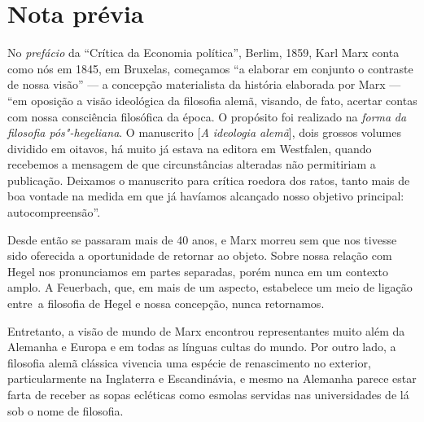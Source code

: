{\let\clearpage\relax\chapter*{Nota prévia\footnotemark}}


No \emph{prefácio} da ``Crítica da Economia política'', Berlim, 1859,
Karl Marx conta como nós em 1845, em Bruxelas, começamos ``a elaborar em
conjunto o contraste de nossa visão'' --- a concepção materialista da
história elaborada por Marx --- ``em oposição a visão ideológica da
filosofia alemã, visando, de fato, acertar contas com nossa consciência
filosófica da época. O propósito foi realizado na \emph{forma} \emph{da
filosofia pós"-hegeliana}. O manuscrito {[}\emph{A ideologia alemã}{]},
dois grossos volumes dividido em oitavos, há muito já estava na editora
em Westfalen, quando recebemos a mensagem de que circunstâncias
alteradas não permitiriam a publicação. Deixamos o manuscrito para
crítica roedora dos ratos, tanto mais de boa vontade na medida em que já
havíamos alcançado nosso objetivo principal: autocompreensão''.

Desde então se passaram mais de 40 anos, e Marx morreu sem que nos
tivesse sido oferecida a oportunidade de retornar ao objeto. Sobre nossa
relação com Hegel nos pronunciamos em partes separadas, porém nunca em
um contexto amplo. A Feuerbach, que, em mais de um aspecto, estabelece
um meio de ligação entre\est\ a filosofia de Hegel e nossa concepção, nunca
retornamos.

Entretanto, a visão de mundo de Marx encontrou representantes muito além
da Alemanha e Europa e em todas as línguas cultas do mundo. Por outro
lado, a filosofia alemã clássica vivencia uma espécie de renascimento no
exterior, particularmente na Inglaterra e Escandinávia, e mesmo na
Alemanha parece estar farta de receber as sopas ecléticas como esmolas
servidas nas universidades de lá sob o nome de filosofia.

